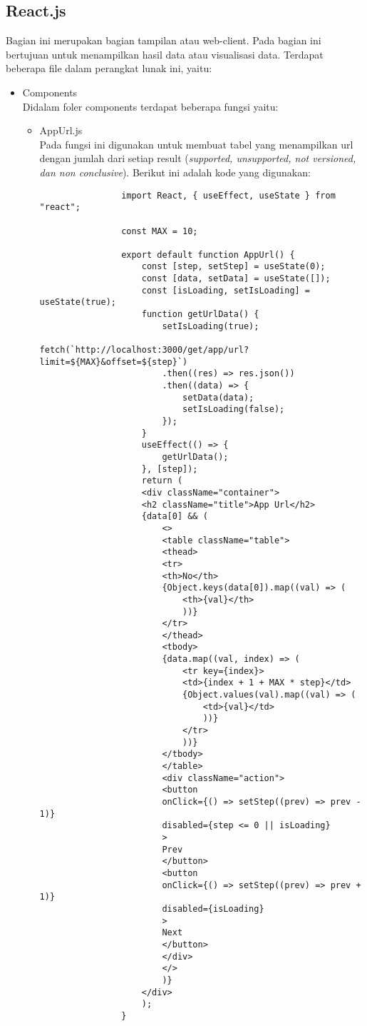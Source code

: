 \subsection{React.js}
Bagian ini merupakan bagian tampilan atau web-client. Pada bagian ini bertujuan untuk menampilkan hasil data atau visualisasi data. Terdapat beberapa file dalam perangkat lunak ini, yaitu:
\begin{itemize}
	\item Components\\
	Didalam foler components terdapat beberapa fungsi yaitu:
	\begin{itemize}
		\item AppUrl.js\\
			Pada fungsi ini digunakan untuk membuat tabel yang menampilkan url dengan jumlah dari setiap result (\textit{supported, unsupported, not versioned, dan non conclusive}). Berikut ini adalah kode yang digunakan:
			\begin{lstlisting}
				import React, { useEffect, useState } from "react";
				
				const MAX = 10;
				
				export default function AppUrl() {
					const [step, setStep] = useState(0);
					const [data, setData] = useState([]);
					const [isLoading, setIsLoading] = useState(true);
					function getUrlData() {
						setIsLoading(true);
						fetch(`http://localhost:3000/get/app/url?limit=${MAX}&offset=${step}`)
						.then((res) => res.json())
						.then((data) => {
							setData(data);
							setIsLoading(false);
						});
					}
					useEffect(() => {
						getUrlData();
					}, [step]);
					return (
					<div className="container">
					<h2 className="title">App Url</h2>
					{data[0] && (
						<>
						<table className="table">
						<thead>
						<tr>
						<th>No</th>
						{Object.keys(data[0]).map((val) => (
							<th>{val}</th>
							))}
						</tr>
						</thead>
						<tbody>
						{data.map((val, index) => (
							<tr key={index}>
							<td>{index + 1 + MAX * step}</td>
							{Object.values(val).map((val) => (
								<td>{val}</td>
								))}
							</tr>
							))}
						</tbody>
						</table>
						<div className="action">
						<button
						onClick={() => setStep((prev) => prev - 1)}
						disabled={step <= 0 || isLoading}
						>
						Prev
						</button>
						<button
						onClick={() => setStep((prev) => prev + 1)}
						disabled={isLoading}
						>
						Next
						</button>
						</div>
						</>
						)}
					</div>
					);
				}
				

\end{lstlisting}
\end{itemize}
\end{itemize}
